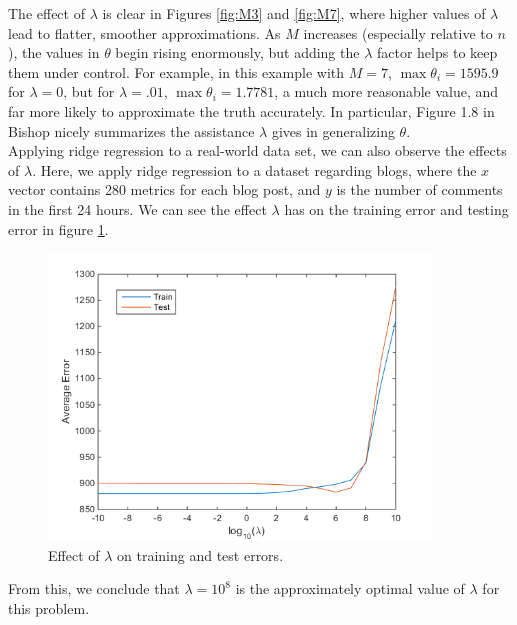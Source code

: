 \documentclass[11pt,letterpaper]{article}
\begin{document}
The effect of $\lambda$ is clear in Figures \ref{fig:M3} and \ref{fig:M7}, where higher values of $\lambda$ lead to flatter, smoother approximations. As $M$ increases (especially relative to $n$), the values in $\theta$ begin rising enormously, but adding the $\lambda$ factor helps to keep them under control. For example, in this example with $M=7$, $\max \theta_i = 1595.9$ for $\lambda = 0$, but for $\lambda = .01$, $\max \theta_i = 1.7781$, a much more reasonable value, and far more likely to approximate the truth accurately. In particular, Figure 1.8 in Bishop nicely summarizes the assistance $\lambda$ gives in generalizing $\theta$.\\

Applying ridge regression to a real-world data set, we can also observe the effects of $\lambda$. Here, we apply ridge regression to a dataset regarding blogs, where the $x$ vector contains 280 metrics for each blog post, and $y$ is the number of comments in the first 24 hours. We can see the effect $\lambda$ has on the training error and testing error in figure \ref{fig:blogData}.

\begin{figure}[!htb]
\begin{center}
\includegraphics[width=4in]{figures/blogData.png}
\caption{Effect of $\lambda$ on training and test errors.}\label{fig:blogData}
\end{center}
\end{figure}

From this, we conclude that $\lambda=10^8$ is the approximately optimal value of $\lambda$ for this problem.
\end{document}
